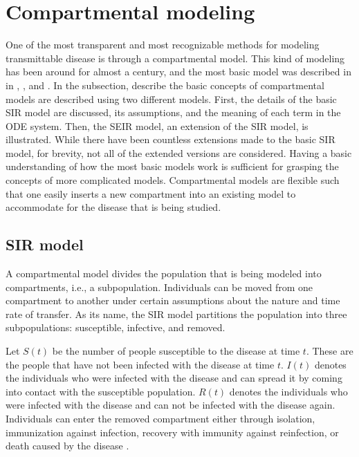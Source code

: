 \section{Compartmental modeling}
\label{sec:literature-review-compartmental-modeling}

One of the most transparent and most recognizable methods for modeling transmittable disease is through a compartmental model.
This kind of modeling has been around for almost a century, and the most basic model was described in \cite{kermackContributionMathematicalTheory1927, kermackContributionsMathematicalTheory1932, kermackContributionsMathematicalTheory1933} in \citeyear{kermackContributionMathematicalTheory1927}, \citeyear{kermackContributionsMathematicalTheory1932}, and \citeyear{ kermackContributionsMathematicalTheory1933}.
In the subsection, describe the basic concepts of compartmental models are described using two different models.
First, the details of the basic \gls{SIR} model are discussed, its assumptions, and the meaning of each term in the \gls{ODE} system.
Then, the SEIR model, an extension of the \gls{SIR} model, is illustrated.
While there have been countless extensions made to the basic \gls{SIR} model, for brevity, not all of the extended versions are considered.
Having a basic understanding of how the most basic models work is sufficient for grasping the concepts of more complicated models.
Compartmental models are flexible such that one easily inserts a new compartment into an existing model to accommodate for the disease that is being studied.

\subsection{SIR model}

A compartmental model divides the population that is being modeled into compartments, i.e., a subpopulation.
Individuals can be moved from one compartment to another under certain assumptions about the nature and time rate of transfer.
As its name, the \gls{SIR} model partitions the population into three subpopulations: susceptible, infective, and removed.

Let $S(t)$ be the number of people susceptible to the disease at time $t$.
These are the people that have not been infected with the disease at time $t$.
$I(t)$ denotes the individuals who were infected with the disease and can spread it by coming into contact with the susceptible population.
$R(t)$ denotes the individuals who were infected with the disease and can not be infected with the disease again.
Individuals can enter the removed compartment either through isolation, immunization against infection, recovery with immunity against reinfection, or death caused by the disease \cite{brauerCompartmentalModelsEpidemiology2008}.

